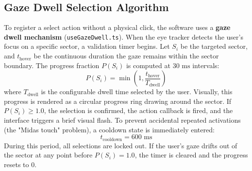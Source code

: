 \subsection{Gaze Dwell Selection Algorithm}
To register a select action without a physical click, the software uses a \textbf{gaze dwell mechanism} (\texttt{useGazeDwell.ts}). When the eye tracker detects the user's focus on a specific sector, a validation timer begins.
Let $S_i$ be the targeted sector, and $t_{\text{hover}}$ be the continuous duration the gaze remains within the sector boundary. The progress fraction $P(S_i)$ is computed at $30\text{ ms}$ intervals:
\begin{equation}
P(S_i) = \min\left(1, \frac{t_{\text{hover}}}{T_{\text{dwell}}}\right)
\end{equation}
where $T_{\text{dwell}}$ is the configurable dwell time selected by the user. 
Visually, this progress is rendered as a circular progress ring drawing around the sector. If $P(S_i) \geq 1.0$, the selection is confirmed, the action callback is fired, and the interface triggers a brief visual flash.
To prevent accidental repeated activations (the "Midas touch" problem), a cooldown state is immediately entered:
\begin{equation}
t_{\text{cooldown}} = 600\text{ ms}
\end{equation}
During this period, all selections are locked out. If the user's gaze drifts out of the sector at any point before $P(S_i) = 1.0$, the timer is cleared and the progress resets to $0$. 

